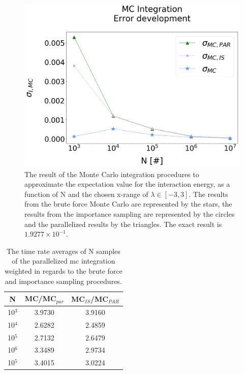 \documentclass[%
reprint,nofootinbib,
amsmath,amssymb,
aps,
]{revtex4-1}
\begin{document}
\begin{figure}[H]
		\vspace{20mm}
	\includegraphics[width=\columnwidth]{MC_integration_error.png}
	\caption{\label{mc_err} The result of the Monte Carlo integration procedures to approximate the expectation value for the interaction energy, as a function of N and the chosen x-range of $\lambda \in[-3,3]$. The results from the brute force Monte Carlo are represented by the stars, the results from the importance sampling are represented by the circles and the parallelized results by the triangles. The exact result is $1.9277\times 10^{-1}$. }
\end{figure} 
\newpage 
\begin{table}[H]
	\caption{\label{time_mc_tab} The time rate averages of N samples of the parallelized mc integration weighted in regards to the brute force and importance sampling procedures.}
	\centering 
	\begin{tabular}{|c|c|c|}
		\hline 
		\hspace{1mm}\textbf{N} \hspace{1mm}& \hspace{1mm} \textbf{MC/MC$_{par}$} \hspace{1mm} & \hspace{1mm}\textbf{MC$_{IS}$/MC$_{PAR}$} \hspace{1mm} \\ \hline 
10$^3$ & 3.9730  & 3.9160  \\
10$^4$ & 2.6282  & 2.4859  \\
10$^5$ & 2.7132  & 2.6479  \\
10$^6$ & 3.3489  & 2.9734  \\
10$^5$ & 3.4015  & 3.0224  \\
		\hline 
	\end{tabular} \\ 
\end{table}
\end{document}
